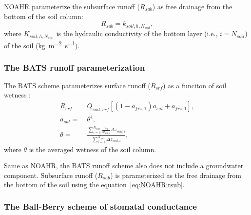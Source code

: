 \documentclass[essd]{copernicus}
\begin{document}
NOAHR parameterize the subsurface runoff (\(R_{sub}\)) as free drainage from the
bottom of the soil column:
\begin{equation}
  R_{sub} = k_{soil,h,N_{soil}} \label{eq:NOAHR:rsub} \text{,}
\end{equation}
where \(K_{soil,h,N_{soil}}\) is the hydraulic conductivity of the bottom layer
(i.e., \(i=N_{soil}\)) of the soil (\si{kg~m^{-2}~s^{-1}}).


\subsubsection{The BATS runoff parameterization}

The BATS scheme parameterizes surface runoff (\(R_{srf}\)) as a funciton of soil
wetness \citep{yang1996GPC}:
\begin{align}
  R_{srf} = & Q_{soil,srf} \left[ (1 - a_{frz,1}) a_{sat} + a_{frz,1} \right]
  \text{,} \\
  a_{sat} = & \theta^4 \text{,} \\
  \theta =  & \frac{\sum_{i=1}^{N_{soil}}\frac{w_i}{w_{sat,i}}\Delta
  z_{soil,i}}{\sum_{i=1}^{N_{soil}}\Delta z_{soil,i}} \text{,}
\end{align}
where \(\theta\) is the averaged wetness of the soil column.

Same as NOAHR, the BATS runoff scheme also does not include a groundwater
component. Subsurface runoff (\(R_{sub}\)) is parameterized as the free drainage
from the bottom of the soil using the equation~\eqref{eq:NOAHR:rsub}.


\subsubsection{The Ball-Berry scheme of stomatal conductance}
\end{document}
